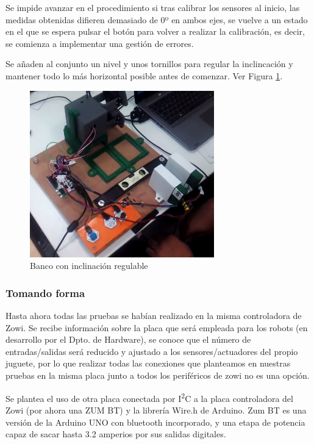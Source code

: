 Se impide avanzar en el procedimiento si tras calibrar los sensores al inicio, las medidas obtenidas difieren demasiado de 0º en ambos ejes, se vuelve a un estado en el que se espera pulsar el botón para volver a realizar la calibración, es decir, se comienza a implementar una gestión de errores.

Se añaden al conjunto un nivel y unos tornillos para regular la inclincación y mantener todo lo más horizontal posible antes de comenzar. Ver Figura \ref{fig:banconivel}.

\begin{figure}
\centering
\includegraphics[width=80mm]{Figures/banco_nivel}
\caption[Banco con inclinación regulable]{Banco con inclinación regulable}
\label{fig:banconivel}
\end{figure}

\subsubsection{Tomando forma}

Hasta ahora todas las pruebas se habían realizado en la misma controladora de Zowi. Se recibe información sobre la placa que será empleada para los robots (en desarrollo por el Dpto. de Hardware), se conoce que el número de entradas/salidas será reducido y ajustado a los sensores/actuadores del propio juguete, por lo que realizar todas las conexiones que planteamos en nuestras pruebas en la misma placa junto a todos los periféricos de zowi no es una opción.

Se plantea el uso de otra placa conectada por I\textsuperscript{2}C a la placa controladora del Zowi (por ahora una ZUM BT) y la librería Wire.h de Arduino. Zum BT es una versión de la Arduino UNO con bluetooth incorporado, y una etapa de potencia capaz de sacar hasta 3.2 amperios por sus salidas digitales.

